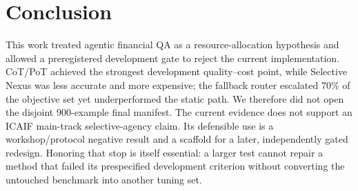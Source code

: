 \section{Conclusion}

This work treated agentic financial QA as a resource-allocation hypothesis and allowed a preregistered development gate to reject the current implementation. CoT/PoT achieved the strongest development quality--cost point, while Selective Nexus was less accurate and more expensive; the fallback router escalated 70\% of the objective set yet underperformed the static path. We therefore did not open the disjoint 900-example final manifest. The current evidence does not support an ICAIF main-track selective-agency claim. Its defensible use is a workshop/protocol negative result and a scaffold for a later, independently gated redesign. Honoring that stop is itself essential: a larger test cannot repair a method that failed its prespecified development criterion without converting the untouched benchmark into another tuning set.
